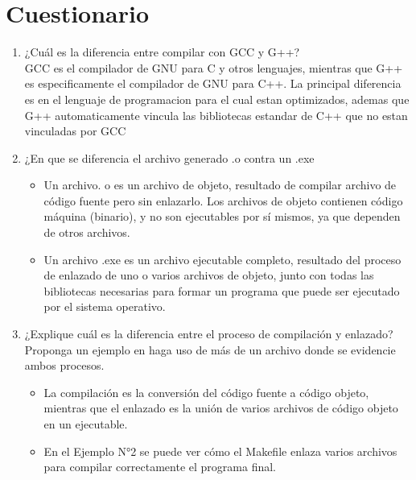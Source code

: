 \documentclass[]{article}
\begin{document}
\section{Cuestionario}
\begin{enumerate}

	\item ¿Cuál es la diferencia entre compilar con GCC y G++? \\
	GCC es el compilador de GNU para C y otros lenguajes, mientras que G++ 
	es especificamente el compilador de GNU para C++. La principal diferencia
	 es en el lenguaje de programacion para el cual estan optimizados, ademas 
	 que G++ automaticamente vincula las bibliotecas estandar de C++ que no 
	 estan vinculadas por GCC

	\item ¿En que se diferencia el archivo generado .o contra un .exe

	\begin{itemize}
		\item Un archivo. o es un archivo de objeto, resultado de compilar 
		archivo de código fuente pero sin enlazarlo. Los archivos de objeto 
		contienen código máquina (binario), y no son ejecutables por sí mismos,
		ya que dependen de otros archivos.
		\item Un archivo .exe es un archivo ejecutable completo, resultado del 
		proceso  de enlazado de uno o varios archivos de objeto, junto con todas
		las bibliotecas necesarias para formar un programa que puede ser 
		ejecutado por el sistema operativo.
	\end{itemize}

	\item ¿Explique cuál es la diferencia entre el proceso de compilación y 
	enlazado? Proponga un ejemplo en haga uso de más de un archivo donde se 
	evidencie ambos procesos.
	\begin{itemize}
		\item La compilación es la conversión del código fuente a código objeto, 
		mientras que el enlazado es la unión de varios archivos de código objeto
		en un ejecutable.
		\item En el Ejemplo N°2 se puede ver cómo el Makefile enlaza varios 
		archivos para compilar correctamente el programa final.
	\end{itemize}
\end{enumerate}


        
\end{document}
